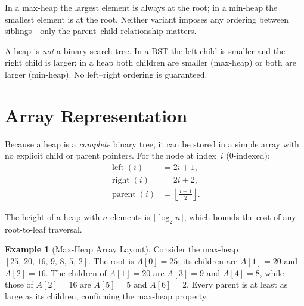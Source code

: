 \documentclass[11pt, a4paper, notitlepage]{report}
\theoremstyle{definition}
\theoremstyle{remark}
\theoremstyle{definition}
\newtheorem{example}[theorem]{Example}
\begin{document}
In a max-heap the largest element is always at the root; in a min-heap the smallest element is at the root.  Neither variant imposes any ordering between siblings---only the parent--child relationship matters.

\begin{examtip}[title={Exam Tip: Heap vs.\ BST}]
A heap is \emph{not} a binary search tree.  In a BST the left child is smaller and the right child is larger; in a heap both children are smaller (max-heap) or both are larger (min-heap).  No left--right ordering is guaranteed.
\end{examtip}

\section{Array Representation}
\label{sec:heap-array}

Because a heap is a \emph{complete} binary tree, it can be stored in a simple array with no explicit child or parent pointers.  For the node at index~$i$ (0-indexed):
\begin{align}
  \operatorname{left}(i)   &= 2i + 1, \label{eq:heap-left}\\
  \operatorname{right}(i)  &= 2i + 2, \label{eq:heap-right}\\
  \operatorname{parent}(i) &= \left\lfloor \frac{i-1}{2} \right\rfloor. \label{eq:heap-parent}
\end{align}

The height of a heap with $n$ elements is $\lfloor \log_2 n \rfloor$, which bounds the cost of any root-to-leaf traversal.

\begin{example}[Max-Heap Array Layout]
\label{ex:heap-array}
Consider the max-heap $[25,\,20,\,16,\,9,\,8,\,5,\,2]$.  The root is $A[0]=25$; its children are $A[1]=20$ and $A[2]=16$.  The children of $A[1]=20$ are $A[3]=9$ and $A[4]=8$, while those of $A[2]=16$ are $A[5]=5$ and $A[6]=2$.  Every parent is at least as large as its children, confirming the max-heap property.
\end{example}
\end{document}
